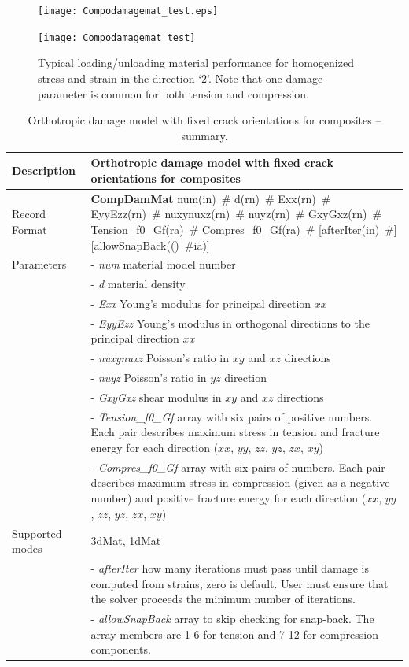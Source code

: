 \documentclass[a4paper]{article}
\newcommand{\descitem}[1]{{\noindent \bf #1}}
\newcommand{\elemparam}[2]{{{#1\tiny (#2)}~\#}}
\newcommand{\param}[1]{{\it #1}}
\newenvironment{mmt}{\begin{tabular}{|l|p{9cm}|}}{\end{tabular}\\}
\newenvironment{mmt}{\begin{tabular}{|l|l|}}{\end{tabular}\\}
\begin{document}
\begin{figure}[!htb]
\begin{htmlonly}
  \centerline{\texttt{[image: Compodamagemat\_test.eps]}}
\end{htmlonly}
\centerline{\texttt{[image: Compodamagemat\_test]}}
  \caption{Typical loading/unloading material performance for homogenized stress and strain in the direction `${2}$'. Note that one damage parameter is common for both tension and compression.}
  \label{comp_performance}
\end{figure}

\begin{table}[!htb]
\begin{mmt}
\hline
Description & Orthotropic damage model with fixed crack orientations for composites\\
\hline
Record Format & \descitem{CompDamMat}  \elemparam{num}{in}
\elemparam{d}{rn} \elemparam{Exx}{rn} \elemparam{EyyEzz}{rn}
\elemparam{nuxynuxz}{rn} \elemparam{nuyz}{rn} \elemparam{GxyGxz}{rn}
\elemparam{Tension\_f0\_Gf}{ra} \elemparam{Compres\_f0\_Gf}{ra} [\elemparam{afterIter}{in}] [\elemparam{allowSnapBack}(ia)]\\
Parameters
&- \param{num} material model number\\
&- \param{d} material density\\
&- \param{Exx} Young's modulus for principal direction $xx$\\
&- \param{EyyEzz} Young's modulus in orthogonal directions to the principal direction $xx$\\
&- \param{nuxynuxz} Poisson's ratio in $xy$ and $xz$ directions\\
&- \param{nuyz} Poisson's ratio in $yz$ direction\\
&- \param{GxyGxz} shear modulus in $xy$ and $xz$ directions\\
&- \param{Tension\_f0\_Gf} array with six pairs of positive numbers. Each pair describes maximum stress in tension and fracture energy for each direction ($xx$, $yy$, $zz$, $yz$, $zx$, $xy$)\\
&- \param{Compres\_f0\_Gf} array with six pairs of numbers. Each pair describes maximum stress in compression (given as a negative number) and positive fracture energy for each direction ($xx$, $yy$, $zz$, $yz$, $zx$, $xy$)\\
Supported modes& 3dMat, 1dMat\\
&- \param {afterIter} how many iterations must pass until damage is computed from strains, zero is default. User must ensure that the solver proceeds the minimum number of iterations.\\
&- \param {allowSnapBack} array to skip checking for snap-back. The array members are 1-6 for tension and 7-12 for compression components.\\
\hline
\end{mmt}
\caption{Orthotropic damage model with fixed crack orientations for composites -- summary.}
\label{compdammat_table}
\end{table}
\end{document}
